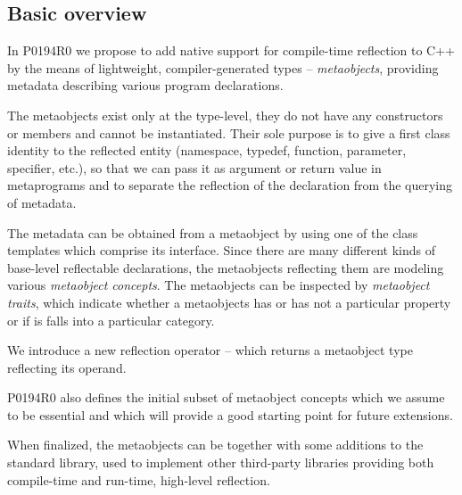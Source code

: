 \subsection{Basic overview}

In P0194R0 we propose to add native support for
compile-time reflection to C++ by the means of lightweight, compiler-generated
types -- {\em metaobjects}, providing metadata describing various program
declarations.

The metaobjects exist only at the type-level, they do not have any constructors
or members and cannot be instantiated. Their sole purpose is to give a
first class identity
to the reflected entity (namespace, typedef, function, parameter, specifier, etc.),
so that we can pass it as argument or return value in metaprograms and to
separate the reflection of the declaration from the querying of metadata.

The metadata can be obtained from a metaobject by using one of the class templates
which comprise its interface.
Since there are many different kinds of
base-level reflectable declarations, the metaobjects reflecting them are
modeling various {\em metaobject concepts}. The metaobjects can be inspected
by {\em metaobject traits}, which indicate whether a metaobjects has or has
not a particular property or if is falls into a particular category.

We introduce a new reflection operator -- \verb@reflexpr@ which returns a
metaobject type reflecting its operand.

P0194R0 also defines the initial subset
of metaobject concepts which we assume to be essential
and which will provide a good starting point for future extensions.

When finalized, the metaobjects can be together with some additions
to the standard library, used to implement other third-party libraries
providing both compile-time and run-time, high-level reflection.

